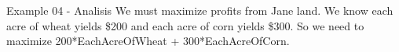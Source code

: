\begin{frame}{Example 04 - Analisis}
We must maximize profits from Jane land. We know each acre of wheat yields
\$200 and each acre of corn yields \$300.  So we need to maximize
200*EachAcreOfWheat + 300*EachAcreOfCorn.

\end{frame}
